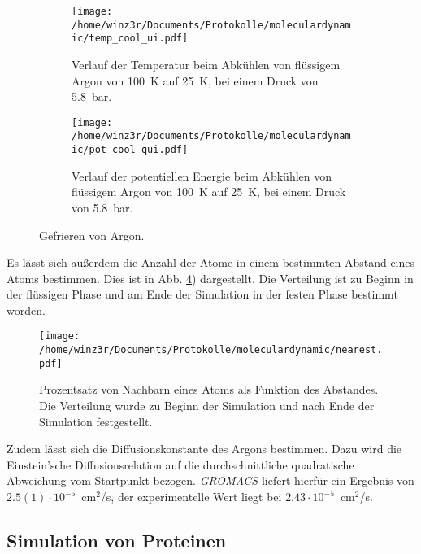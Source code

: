 \begin{figure}
\begin{subfigure}{0.45\textwidth}\centering
\texttt{[image: /home/winz3r/Documents/Protokolle/moleculardynamic/temp\_cool\_ui.pdf]}\caption{\centering Verlauf der Temperatur beim Abkühlen von flüssigem Argon von 100~K auf 25~K, bei einem Druck von 5.8~bar.}\label{fig:liqtemp}
\end{subfigure}
\hspace{0.5cm}
\begin{subfigure}{0.45\textwidth}\centering
\texttt{[image: /home/winz3r/Documents/Protokolle/moleculardynamic/pot\_cool\_qui.pdf]}\caption{\centering Verlauf der potentiellen Energie beim Abkühlen von flüssigem Argon von 100~K auf 25~K, bei einem Druck von 5.8~bar.}\label{fig:liqpot}
\end{subfigure}
\caption{Gefrieren von Argon.}
\end{figure}
\noindent
Es lässt sich außerdem die Anzahl der Atome in einem bestimmten Abstand eines Atoms bestimmen. Dies ist in Abb. \ref{fig:nearest}) dargestellt. Die Verteilung ist zu Beginn in der flüssigen Phase und am Ende der Simulation in der festen Phase bestimmt worden.
\begin{figure}
\centering
\texttt{[image: /home/winz3r/Documents/Protokolle/moleculardynamic/nearest.pdf]}\caption{ \centering Prozentsatz von Nachbarn eines Atoms als Funktion des Abstandes. Die Verteilung wurde zu Beginn der Simulation und nach Ende der Simulation festgestellt.}\label{fig:nearest}
\end{figure}
\noindent
Zudem lässt sich die Diffusionskonstante des Argons bestimmen. Dazu wird die Einstein'sche Diffusionsrelation auf die durchschnittliche quadratische Abweichung vom Startpunkt bezogen. \emph{GROMACS} liefert hierfür ein Ergebnis von $2.5(1)\cdot 10 ^{-5}$~cm$^2$/s, der experimentelle Wert liegt bei $2.43 \cdot
10^{-5}$~cm$^2$/s.
\subsection{Simulation von Proteinen}
